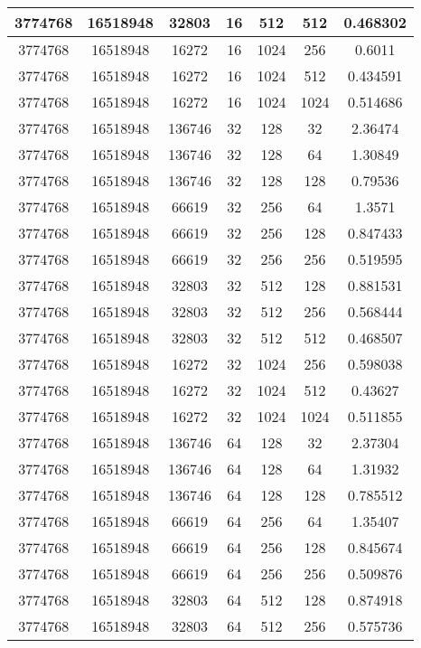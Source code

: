 \documentclass[9pt]{article}
\begin{document}
\begin{tabular}{|c|c|c|c|c|c|c| }
\hline
3774768  & 16518948  & 32803  & 16  & 512  & 512  & 0.468302 \\
\hline
3774768  & 16518948  & 16272  & 16  & 1024  & 256  & 0.6011 \\
\hline
3774768  & 16518948  & 16272  & 16  & 1024  & 512  & 0.434591 \\
\hline
3774768  & 16518948  & 16272  & 16  & 1024  & 1024  & 0.514686 \\
\hline
3774768  & 16518948  & 136746  & 32  & 128  & 32  & 2.36474 \\
\hline
3774768  & 16518948  & 136746  & 32  & 128  & 64  & 1.30849 \\
\hline
3774768  & 16518948  & 136746  & 32  & 128  & 128  & 0.79536 \\
\hline
3774768  & 16518948  & 66619  & 32  & 256  & 64  & 1.3571 \\
\hline
3774768  & 16518948  & 66619  & 32  & 256  & 128  & 0.847433 \\
\hline
3774768  & 16518948  & 66619  & 32  & 256  & 256  & 0.519595 \\
\hline
3774768  & 16518948  & 32803  & 32  & 512  & 128  & 0.881531 \\
\hline
3774768  & 16518948  & 32803  & 32  & 512  & 256  & 0.568444 \\
\hline
3774768  & 16518948  & 32803  & 32  & 512  & 512  & 0.468507 \\
\hline
3774768  & 16518948  & 16272  & 32  & 1024  & 256  & 0.598038 \\
\hline
3774768  & 16518948  & 16272  & 32  & 1024  & 512  & 0.43627 \\
\hline
3774768  & 16518948  & 16272  & 32  & 1024  & 1024  & 0.511855 \\
\hline
3774768  & 16518948  & 136746  & 64  & 128  & 32  & 2.37304 \\
\hline
3774768  & 16518948  & 136746  & 64  & 128  & 64  & 1.31932 \\
\hline
3774768  & 16518948  & 136746  & 64  & 128  & 128  & 0.785512 \\
\hline
3774768  & 16518948  & 66619  & 64  & 256  & 64  & 1.35407 \\
\hline
3774768  & 16518948  & 66619  & 64  & 256  & 128  & 0.845674 \\
\hline
3774768  & 16518948  & 66619  & 64  & 256  & 256  & 0.509876 \\
\hline
3774768  & 16518948  & 32803  & 64  & 512  & 128  & 0.874918 \\
\hline
3774768  & 16518948  & 32803  & 64  & 512  & 256  & 0.575736 \\

\end{tabular}
\end{document}
